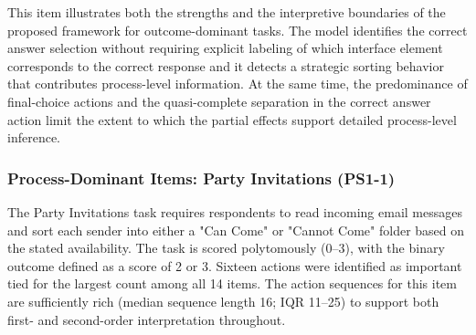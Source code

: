 This item illustrates both the strengths and the interpretive boundaries of the proposed framework for outcome-dominant tasks. The model identifies the correct answer selection without requiring explicit labeling of which interface element corresponds to the correct response and it detects a strategic sorting behavior that contributes process-level information. At the same time, the predominance of final-choice actions and the quasi-complete separation in the correct answer action limit the extent to which the partial effects support detailed process-level inference.



\subsubsection{Process-Dominant Items: Party Invitations (PS1-1)}

The Party Invitations task requires respondents to read incoming email messages and sort each sender into either a "Can Come" or "Cannot Come" folder based on the stated availability. The task is scored polytomously (0--3), with the binary outcome defined as a score of 2 or 3. Sixteen actions were identified as important tied for the largest count among all 14 items. The action sequences for this item are sufficiently rich (median sequence length 16; IQR 11--25) to support both first- and second-order interpretation throughout.

